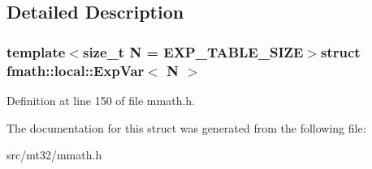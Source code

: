 \subsection{Detailed Description}
\subsubsection*{template$<$size\-\_\-t N = E\-X\-P\-\_\-\-T\-A\-B\-L\-E\-\_\-\-S\-I\-Z\-E$>$struct fmath\-::local\-::\-Exp\-Var$<$ N $>$}



Definition at line 150 of file mmath.\-h.



The documentation for this struct was generated from the following file\-:\begin{DoxyCompactItemize}
\item 
src/mt32/mmath.\-h\end{DoxyCompactItemize}
